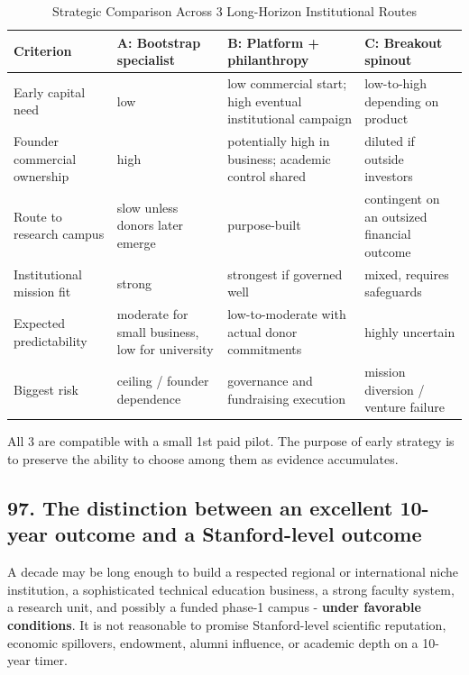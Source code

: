 \begin{table}[t]
\centering
\small
\caption{Strategic Comparison Across 3 Long-Horizon Institutional Routes}
\label{tab:ch36_routes_comparison}
\begin{tabularx}{\textwidth}{p{3.0cm} p{3.5cm} p{4.0cm} X}
\toprule
\textbf{ Criterion } & \textbf{ A: Bootstrap specialist } & \textbf{ B: Platform + philanthropy } & \textbf{ C: Breakout spinout } \\
\midrule
 Early capital need  &  low  &  low commercial start; high eventual institutional campaign  &  low-to-high depending on product  \\
 Founder commercial ownership  &  high  &  potentially high in business; academic control shared  &  diluted if outside investors  \\
 Route to research campus  &  slow unless donors later emerge  &  purpose-built  &  contingent on an outsized financial outcome  \\
 Institutional mission fit  &  strong  &  strongest if governed well  &  mixed, requires safeguards  \\
 Expected predictability  &  moderate for small business, low for university  &  low-to-moderate with actual donor commitments  &  highly uncertain  \\
 Biggest risk  &  ceiling / founder dependence  &  governance and fundraising execution  &  mission diversion / venture failure  \\
\bottomrule
\end{tabularx}
\end{table}

All 3 are compatible with a small 1st paid pilot. The purpose of early strategy is to preserve the ability to choose among them as evidence accumulates.

\subsection{97. The distinction between an excellent 10-year outcome and a Stanford-level outcome}

A decade may be long enough to build a respected regional or international niche institution, a sophisticated technical education business, a strong faculty system, a research unit, and possibly a funded phase-1 campus - \textbf{under favorable conditions}. It is not reasonable to promise Stanford-level scientific reputation, economic spillovers, endowment, alumni influence, or academic depth on a 10-year timer.

